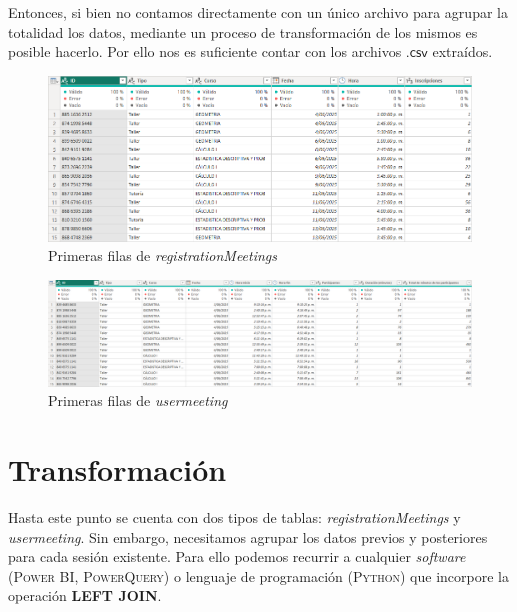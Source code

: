 \documentclass[11pt,a4paper]{book}
\theoremstyle{definition}%
\begin{document}
                Entonces, si bien no contamos directamente con un único archivo para agrupar la totalidad los datos, mediante un proceso de transformación de los mismos es posible hacerlo. Por ello nos es suficiente contar con los archivos $\mathsf{.csv}$ extraídos.
                
                \begin{figure}[H]
                    \centering
                    \includegraphics[width=1\textwidth]{Sources/registrationMeetings_Head.png}
                    \caption{Primeras filas de \textit{registrationMeetings}}
                    \label{fig:registrationMeetings_head}
                \end{figure}
                \begin{figure}[H]
                    \centering
                    \includegraphics[width=1\textwidth]{Sources/usermeetings_Head.png}
                    \caption{Primeras filas de \textit{usermeeting}}
                    \label{fig:usermeetings_head}
                \end{figure}
            \section{Transformación}
                Hasta este punto se cuenta con dos tipos de tablas: \textit{registrationMeetings} y \textit{usermeeting}. Sin embargo, necesitamos agrupar los datos previos y posteriores para cada sesión existente. Para ello podemos recurrir a cualquier \textit{software} (\textsc{Power BI}, \textsc{PowerQuery}) o lenguaje de programación (\textsc{Python}) que incorpore la operación \textbf{LEFT JOIN}.
\end{document}
